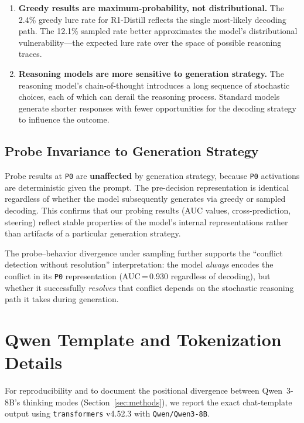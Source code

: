 \documentclass{article}
\newcommand{\pzero}{\texttt{P0}}
\begin{document}
\begin{enumerate}[leftmargin=*,itemsep=2pt]
  \item \textbf{Greedy results are maximum-probability, not
  distributional.}  The 2.4\% greedy lure rate for R1-Distill
  reflects the single most-likely decoding path.  The 12.1\%
  sampled rate better approximates the model's distributional
  vulnerability---the expected lure rate over the space of
  possible reasoning traces.

  \item \textbf{Reasoning models are more sensitive to generation
  strategy.}  The reasoning model's chain-of-thought introduces
  a long sequence of stochastic choices, each of which can
  derail the reasoning process.  Standard models generate shorter
  responses with fewer opportunities for the decoding strategy
  to influence the outcome.
\end{enumerate}

\subsection{Probe Invariance to Generation Strategy}

Probe results at \pzero{} are \textbf{unaffected} by
generation strategy, because \pzero{} activations are deterministic
given the prompt.  The pre-decision representation is identical
regardless of whether the model subsequently generates via greedy or
sampled decoding.  This confirms that our probing results (AUC
values, cross-prediction, steering) reflect stable properties of the
model's internal representations rather than artifacts of a particular
generation strategy.

The probe--behavior divergence under sampling further supports the
``conflict detection without resolution'' interpretation: the model
\emph{always} encodes the conflict in its \pzero{} representation
(AUC\,=\,0.930 regardless of decoding), but whether it successfully
\emph{resolves} that conflict depends on the stochastic reasoning
path it takes during generation.

\section{Qwen Template and Tokenization Details}
\label{app:qwen_template}

For reproducibility and to document the positional divergence between
Qwen~3-8B's thinking modes (Section~\ref{sec:methods}), we report the
exact chat-template output using \texttt{transformers} v4.52.3 with
\texttt{Qwen/Qwen3-8B}.
\end{document}
